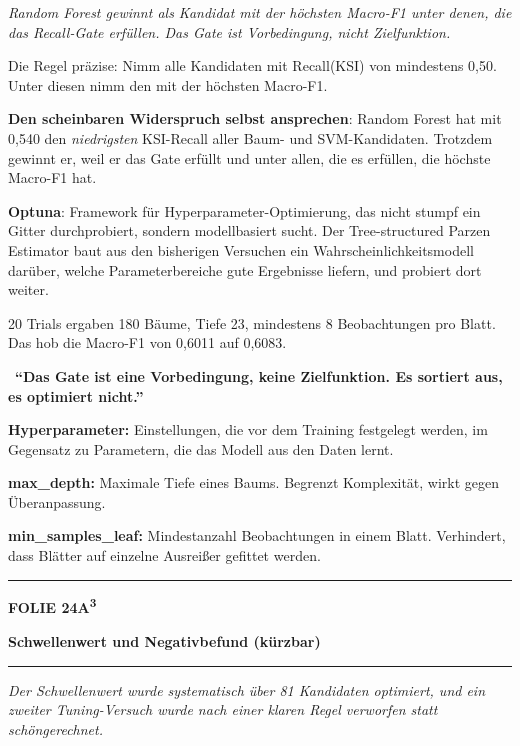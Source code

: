 \documentclass[9pt]{extarticle}
\newcommand{\karte}[3]{%
  \clearpage
  {\color{Accent}\rule{\linewidth}{2.4pt}}\par\vspace{2.5pt}
  {\fontsize{8}{9}\selectfont\bfseries\color{Accent}%
   FOLIE #1\hspace{1.2em}\textbar\hspace{1.2em}#2}\par\vspace{1pt}
  {\fontsize{16}{18}\selectfont\bfseries\color{AccentDark}#3}\par\vspace{3pt}
  {\color{Accent!45}\rule{\linewidth}{0.5pt}}\par\vspace{4pt}%
}
\newcommand{\rubrik}[1]{%
  \vspace{3.5pt}{\fontsize{7.5}{8.5}\selectfont\bfseries\color{Grau}%
  \MakeUppercase{#1}}\par\vspace{1.5pt}}
\newcommand{\kernsatz}[1]{%
  \begin{tcolorbox}[enhanced,sharp corners,boxrule=0pt,
    leftrule=2.2pt,colframe=Accent,colback=AccentPale,
    left=5pt,right=5pt,top=3.5pt,bottom=3.5pt,before skip=1pt,after skip=2pt]
    \color{AccentDark}\itshape #1
  \end{tcolorbox}}
\newcommand{\merksatz}[1]{%
  \vspace{2pt}{\color{KSI}$\blacktriangleright$}\ \textbf{\color{KSI}#1}\par}
\newcommand{\bg}[2]{\item \textbf{#1:} #2}
\begin{document}
\kernsatz{Random Forest gewinnt als Kandidat mit der höchsten Macro-F1 unter denen, die das
Recall-Gate erfüllen. Das Gate ist Vorbedingung, nicht Zielfunktion.}

\rubrik{Sagen}
\begin{sag}
  \item Die Regel präzise: Nimm alle Kandidaten mit Recall(KSI) von mindestens 0,50. Unter
        diesen nimm den mit der höchsten Macro-F1.
  \item \textbf{Den scheinbaren Widerspruch selbst ansprechen}: Random Forest hat mit 0,540 den
        \textit{niedrigsten} KSI-Recall aller Baum- und SVM-Kandidaten. Trotzdem gewinnt er,
        weil er das Gate erfüllt und unter allen, die es erfüllen, die höchste Macro-F1 hat.
  \item \textbf{Optuna}: Framework für Hyperparameter-Optimierung, das nicht stumpf ein Gitter
        durchprobiert, sondern modellbasiert sucht. Der Tree-structured Parzen Estimator baut aus
        den bisherigen Versuchen ein Wahrscheinlichkeitsmodell darüber, welche Parameterbereiche
        gute Ergebnisse liefern, und probiert dort weiter.
  \item 20 Trials ergaben 180 Bäume, Tiefe 23, mindestens 8 Beobachtungen pro Blatt. Das hob die
        Macro-F1 von 0,6011 auf 0,6083.
\end{sag}

\merksatz{\enquote{Das Gate ist eine Vorbedingung, keine Zielfunktion. Es sortiert aus, es
optimiert nicht.}}

\rubrik{Begriffe}
\begin{begriff}
  \bg{Hyperparameter}{Einstellungen, die vor dem Training festgelegt werden, im Gegensatz zu
      Parametern, die das Modell aus den Daten lernt.}
  \bg{max\_depth}{Maximale Tiefe eines Baums. Begrenzt Komplexität, wirkt gegen Überanpassung.}
  \bg{min\_samples\_leaf}{Mindestanzahl Beobachtungen in einem Blatt. Verhindert, dass Blätter
      auf einzelne Ausreißer gefittet werden.}
\end{begriff}

\karte{24}{A\textsuperscript{3}}{Schwellenwert und Negativbefund \textnormal{\small(kürzbar)}}

\kernsatz{Der Schwellenwert wurde systematisch über 81 Kandidaten optimiert, und ein zweiter
Tuning-Versuch wurde nach einer klaren Regel verworfen statt schöngerechnet.}
\end{document}
